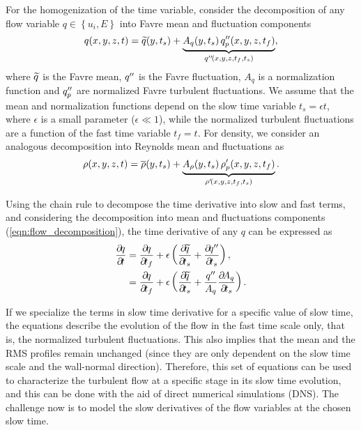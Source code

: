 {For the homogenization of the time variable, consider the
decomposition of any flow variable $q\in\left\{u_i,E\right\}$ into Favre mean and
fluctuation components
%
\begin{equation}
\label{eqn:flow_decomposition}
\func{q}{x, y, z, t} =
  \func{\fav{q}}{y, t_s} +
  \underbrace{%
   \func{A_{q}}{y,t_s} \func{\ffluc{q}_p}{x,y,z,t_f}
  }_{\func{\ffluc{q}}{x,y,z,t_f,t_s}},
\end{equation}
%
where $\widetilde{q}$ is the Favre mean, $q''$ is the Favre fluctuation, $A_{q}$
is a normalization function and $q''_p$ are normalized Favre turbulent
fluctuations.  We assume that the mean and normalization functions depend on
the slow time variable $t_s=\epsilon t$, where $\epsilon$ is a small parameter
($\epsilon\ll{}1$), while the normalized turbulent fluctuations are a function of
the fast time variable $t_f=t$.
%
For density, we consider an analogous decomposition into Reynolds mean and
fluctuations as
%
\begin{equation}
\label{eqn:rho_decomposition}
\func{\rho}{x, y, z, t} =
  \func{\mean{\rho}}{y, t_s} +
  \underbrace{%
   \func{A_{\rho}}{y,t_s} \func{\fluc{\rho}_p}{x,y,z,t_f}
  }_{\func{\fluc{\rho}}{x,y,z,t_f,t_s}}.
\end{equation}
%

Using the chain rule to decompose the time derivative into slow and fast terms,
and considering the decomposition into mean and fluctuations components
(\ref{eqn:flow_decomposition}), the time derivative of any $q$ can be expressed as
%
\begin{equation}
\begin{split}
\pp{q}{t}
       &= \pp{q}{t_f} + \epsilon \left(\pp{\fav{q}}{t_s}
          + \pp{\ffluc{q}}{t_s}\right), \\
       &= \pp{q}{t_f} + \epsilon \left(\pp{\fav{q}}{t_s}
          + \frac{\ffluc{q}}{A_q} \pp{A_q}{t_s} \right).
\end{split}
\end{equation}
%

If we specialize the terms in slow time derivative for a specific value of slow
time, the equations describe the evolution of the flow in the fast time
scale only, that is, the normalized turbulent fluctuations.
%
This also implies that the mean and the RMS profiles remain unchanged (since
they are only dependent on the slow time scale and the wall-normal direction).
%
Therefore, this set of equations can be used to characterize the turbulent flow
at a specific stage in its slow time evolution, and this can be done with the
aid of direct numerical simulations (DNS).
%
The challenge now is to model the slow derivatives of the flow variables at the
chosen slow time.

}
